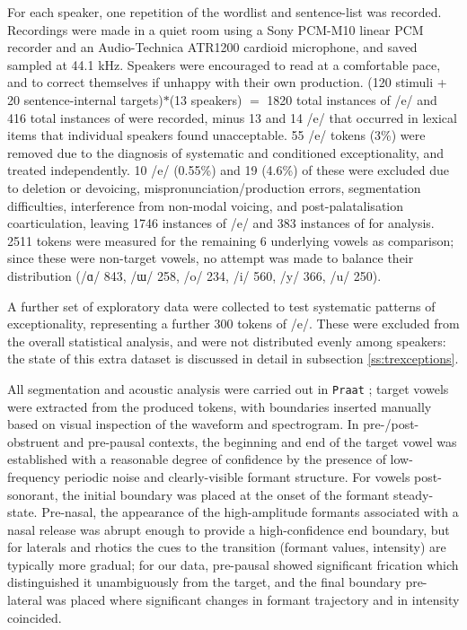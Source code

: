 For each speaker, one repetition of the wordlist and sentence-list was recorded. Recordings were made in a quiet room using a Sony PCM-M10 linear PCM recorder and an Audio-Technica ATR1200 cardioid microphone, and saved sampled at 44.1 kHz. Speakers were encouraged to read at a comfortable pace, and to correct themselves if unhappy with their own production. (120 stimuli + 20 sentence-internal targets)$*$(13 speakers) $=$ 1820 total instances of /e/ and 416 total instances of \ur{\o} were recorded, minus 13 \ur{\o} and 14 /e/ that occurred in lexical items that individual speakers found unacceptable. 55 /e/ tokens (3\%) were removed due to the diagnosis of systematic and conditioned exceptionality, and treated independently. 10 /e/ (0.55\%) and 19 \ur{\o} (4.6\%) of these were excluded due to deletion or devoicing, mispronunciation/production errors, segmentation difficulties, interference from non-modal voicing, and post-palatalisation coarticulation, leaving 1746 instances of /e/ and 383 instances of \ur{\o} for analysis. 2511 tokens were measured for the remaining 6 underlying vowels as comparison; since these were non-target vowels, no attempt was made to balance their distribution (/ɑ/ 843, /ɯ/ 258, /o/ 234, /i/ 560, /y/ 366, /u/ 250).

A further set of exploratory data were collected to test systematic patterns of exceptionality, representing a further 300 tokens of /e/. These were excluded from the overall statistical analysis, and were not distributed evenly among speakers: the state of this extra dataset is discussed in detail in subsection \ref{ss:trexceptions}.

All segmentation and acoustic analysis were carried out in \texttt{Praat} \citep{Praat}; target vowels were extracted from the produced tokens, with boundaries inserted manually based on visual inspection of the waveform and spectrogram. In pre-/post- obstruent and pre-pausal contexts, the beginning and end of the target vowel was established with a reasonable degree of confidence by the presence of low-frequency periodic noise and clearly-visible formant structure. For vowels post-sonorant, the initial boundary was placed at the onset of the formant steady-state. Pre-nasal, the appearance of the high-amplitude formants associated with a nasal release was abrupt enough to provide a high-confidence end boundary, but for laterals and rhotics the cues to the transition (formant values, intensity) are typically more gradual; for our data, pre-pausal  showed significant frication which distinguished it unambiguously from the target, and the final boundary pre-lateral was placed where significant changes in formant trajectory and in intensity coincided.

